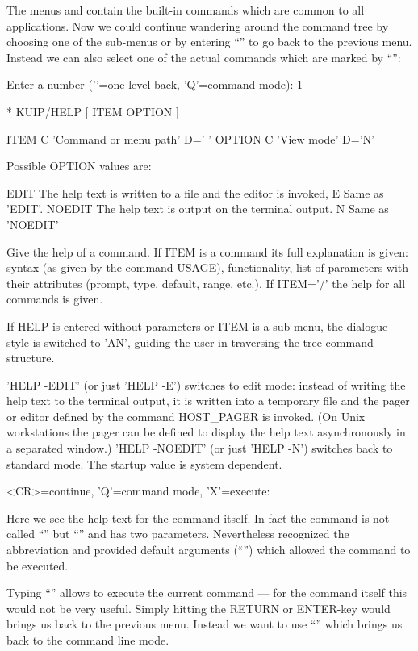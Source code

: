The menus  and  contain the \KUIP{}
built-in commands which are common to all applications.
Now we could continue wandering around the command tree by choosing
one of the sub-menus or by entering ``\bsol'' to go back to the previous menu.
Instead we can also select one of the actual commands which are marked
by ``\Lit{*}'':
\begin{XMP}
Enter a number ('\bsol'=one level back, 'Q'=command mode): \underline{1}

 * KUIP/HELP [ ITEM OPTION ]

   ITEM       C 'Command or menu path' D=' '
   OPTION     C 'View mode' D='N'

   Possible OPTION values are:

    EDIT    The help text is written to a file and the editor is invoked,
    E       Same as 'EDIT'.
    NOEDIT  The help text is output on the terminal output.
    N       Same as 'NOEDIT'

   Give the help of a command.  If ITEM is a command its full explanation is
   given:  syntax (as given by the command USAGE), functionality, list of
   parameters with their attributes (prompt, type, default, range, etc.).  If
   ITEM='/' the help for all commands is given.

   If HELP is entered without parameters or ITEM is a sub-menu, the dialogue
   style is switched to 'AN', guiding the user in traversing the tree command
   structure.

   'HELP -EDIT' (or just 'HELP -E') switches to edit mode:  instead of writing
   the help text to the terminal output, it is written into a temporary file
   and the pager or editor defined by the command HOST_PAGER is invoked.  (On
   Unix workstations the pager can be defined to display the help text
   asynchronously in a separated window.) 'HELP -NOEDIT' (or just 'HELP -N')
   switches back to standard mode.  The startup value is system dependent.

<CR>=continue, 'Q'=command mode, 'X'=execute:
\end{XMP}

Here we see the help text for the  command itself.
In fact the command is not called ``'' but
``'' and has two parameters.
Nevertheless \KUIP{} recognized the abbreviation and provided
default arguments (``'') which allowed the command to be
executed. 

Typing ``'' allows to execute the current command
--- for the  command itself this would not be very useful.
Simply hitting the \textsc{RETURN} or \textsc{ENTER}-key would
brings us back to the previous menu.
Instead we want to use ``'' which brings us back to the
command line mode.

